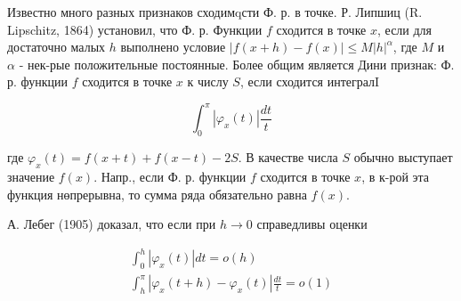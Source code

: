 \documentclass[10pt]{article}
\begin{document}
Известно много разных признаков сходимqсти Ф. р. в точке. Р. Липшиц (R. Lipschitz, 1864) установил, что Ф. р. Функции $f$ сходится в точке $x$, если для достаточно малых $h$ выполнено условие $|f(x+h)-f(x)| \leqslant M|h|^{\alpha}$, где $M$ и $\alpha$ - нек-рые положительные постоянные. Более общим является Дини признак: Ф. р. функции $f$ сходится в точке $x$ к числу $S$, если сходится интегралI



\[

\int_{0}^{\pi}\left|\varphi_{x}(t)\right| \frac{d t}{t}

\]



где $\varphi_{x}(t)=f(x+t)+f(x-t)-2 S$. В качестве числа $S$ обычно выступает значение $f(x)$. Напр., если Ф. р. функции $f$ сходится в точке $x$, в к-рой эта функция нөпрерывна, то сумма ряда обязательно равна $f(x)$.



А. Лебег (1905) доказал, что если при $h \rightarrow 0$ справедливы оценки



\[

\begin{gathered}

\int_{0}^{h}\left|\varphi_{x}(t)\right| d t=o(h) \\

\int_{h}^{\pi}\left|\varphi_{x}(t+h)-\varphi_{x}(t)\right| \frac{d t}{t}=o(1)

\end{gathered}

\]
\end{document}
